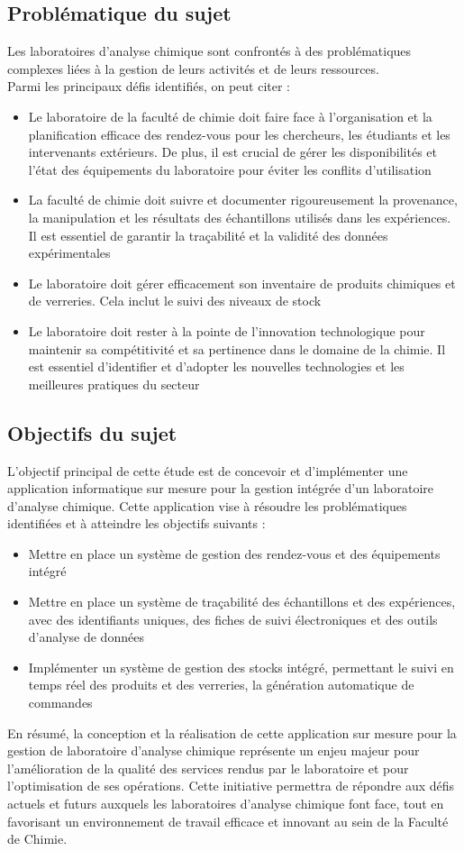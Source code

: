 \subsection{Problématique du sujet}
Les laboratoires d'analyse chimique sont confrontés à des problématiques complexes liées à la gestion de leurs activités et de leurs ressources. \\
Parmi les principaux défis identifiés, on peut citer :
\begin{itemize}
  \item Le laboratoire de la faculté de chimie doit faire face à l'organisation et la planification efficace des rendez-vous pour les chercheurs, les étudiants et les intervenants extérieurs. De plus, il est crucial de gérer les disponibilités et l'état des équipements du laboratoire pour éviter les conflits d'utilisation
  \item La faculté de chimie doit suivre et documenter rigoureusement la provenance, la manipulation et les résultats des échantillons utilisés dans les expériences. Il est essentiel de garantir la traçabilité et la validité des données expérimentales
  \item Le laboratoire doit gérer efficacement son inventaire de produits chimiques et de verreries. Cela inclut le suivi des niveaux de stock 
  \item Le laboratoire doit rester à la pointe de l'innovation technologique pour maintenir sa compétitivité et sa pertinence dans le domaine de la chimie. Il est essentiel d'identifier et d'adopter les nouvelles technologies et les meilleures pratiques du secteur
\end{itemize}
\subsection{Objectifs du sujet}
L'objectif principal de cette étude est de concevoir et d'implémenter une application informatique sur mesure pour la gestion intégrée d'un laboratoire d'analyse chimique. Cette application vise à résoudre les problématiques identifiées et à atteindre les objectifs suivants :
\begin{itemize}
\item  Mettre en place un système de gestion des rendez-vous et des équipements intégré
\item  Mettre en place un système de traçabilité des échantillons et des expériences, avec des identifiants uniques, des fiches de suivi électroniques et des outils d'analyse de données
\item  Implémenter un système de gestion des stocks intégré, permettant le suivi en temps réel des produits et des verreries, la génération automatique de commandes
\end{itemize}
En résumé, la conception et la réalisation de cette application sur mesure pour la gestion de laboratoire d'analyse chimique représente un enjeu majeur pour l'amélioration de la qualité des services rendus par le laboratoire et pour l'optimisation de ses opérations. Cette initiative permettra de répondre aux défis actuels et futurs auxquels les laboratoires d'analyse chimique font face, tout en favorisant un environnement de travail efficace et innovant au sein de la Faculté de Chimie.
